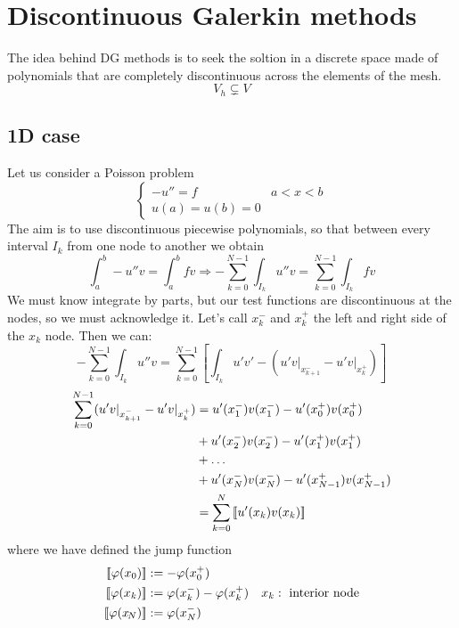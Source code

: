 \section{Discontinuous Galerkin methods}
The idea behind DG methods is to seek the soltion in a discrete space made of polynomials that are completely discontinuous across the elements of the mesh.
\[
    V_h \subsetneq V
\]
\subsection{1D case}
Let us consider a Poisson problem 
\[
    \begin{cases}
        -u'' = f & a < x < b \\
        u(a) = u(b) = 0
    \end{cases}
\]
The aim is to use discontinuous piecewise polynomials, so that between every interval \(I_k\) from one node to another we obtain
\[
    \int_{a}^b -u''v = \int_a^b fv \Rightarrow - \sum_{k=0}^{N-1} \int_{I_k} u''v = \sum_{k=0}^{N-1} \int_{I_k} fv
\]
We must know integrate by parts, but our test functions are discontinuous at the nodes, so we must acknowledge it. Let's call \(x_k^-\) and \(x_k^+\) the left and right side of the \(x_k\) node. Then we can:
\begin{equation}
    -\sum_{k=0}^{N-1} \int_{I_k} u''v = \sum_{k=0}^{N-1} \left[ \int_{I_k}u'v' - \left( u'v\vert_{x_{k+1}^-} - u'v\vert_{x_k^+} \right) \right] \label{integration_by_parts_dg}
\end{equation}
    \begin{align}
    \sum_{k=0}^{N-1} (u'v\vert_{x_{k+1}^-} - u'v\vert_{x_k^+}) &= u'(x_1^-)v(x_1^-) - u'(x_0^+)v(x_0^+) \nonumber\\
    & + u'(x_2^-)v(x_2^-) - u'(x_1^+)v(x_1^+) \nonumber\\
    & + \ldots \\
    & + u'(x_N^-)v(x_N^-) - u'(x_{N-1}^+)v(x_{N-1}^+) \nonumber\\
    & = \sum_{k=0}^{N} \left[\!\left[u'(x_k)v(x_k)\right]\!\right] \nonumber \label{step_for_jump_dg}
\end{align}
where we have defined the jump function
\begin{align}
    \left[\!\left[\varphi(x_0)\right]\!\right] &:= -\varphi(x^+_0) & \nonumber\\
    \left[\!\left[\varphi(x_k)\right]\!\right] &:= \varphi(x_k^-) -\varphi(x^+_k) & x_k :\text{ interior node} \\
    \left[\!\left[\varphi(x_{\!N})\right]\!\right] &:= \varphi(x^-_N) &\nonumber \label{jump_function}
\end{align}
